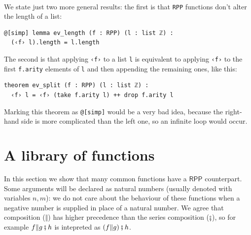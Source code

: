 \documentclass{book}
\theoremstyle{definition}
\theoremstyle{remark}
\theoremstyle{plain}
\newcommand{\RPP}{\mathsf{RPP}}
\newcommand{\rppCo}{\fatsemi}
\newcommand{\rppPa}{\Vert}
\begin{document}
\paragraph{}

We state just two more general results:
the first is that \lstinline{RPP} functions don't alter the length of a list:
\begin{lstlisting}
@[simp] lemma ev_length (f : RPP) (l : list ℤ) :
  (‹f› l).length = l.length
\end{lstlisting}
The second is that applying \lstinline{‹f›} to a list \lstinline{l}
is equivalent to applying \lstinline{‹f›} to the first \lstinline{f.arity} elements of \lstinline{l}
and then appending the remaining ones, like this:
\begin{lstlisting}
theorem ev_split (f : RPP) (l : list ℤ) :
  ‹f› l = ‹f› (take f.arity l) ++ drop f.arity l
\end{lstlisting}
Marking this theorem as \lstinline{@[simp]} would be a very bad idea,
because the right-hand side is more complicated than the left one,
so an infinite loop would occur.

\newpage
\section{A library of functions}

In this section we show that many common functions have a $\RPP$ counterpart.
Some arguments will be declared as natural numbers (usually denoted with variables $n, m$):
we do not care about the behaviour of these functions when a negative number is supplied in place of a natural number.
We agree that composition ($\rppPa$) has higher precedence than the series composition ($\rppCo$),
so for example $f \rppPa g \rppCo h$ is intepreted as $(f \rppPa g) \rppCo h$.
\end{document}
